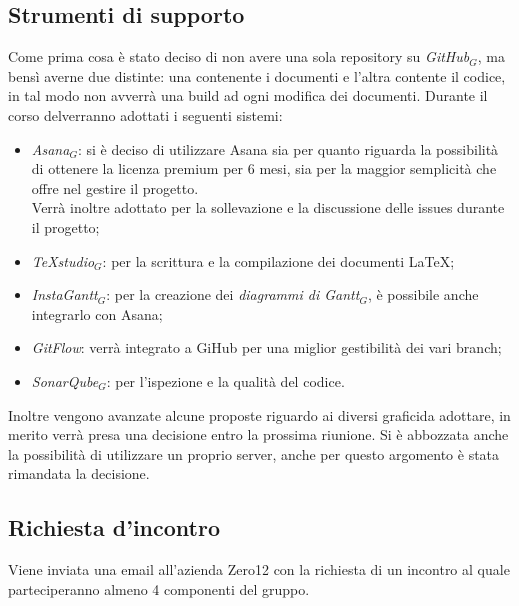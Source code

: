 \documentclass[a4paper,12pt]{article}
\begin{document}
	\subsection{Strumenti di supporto}
	Come prima cosa è stato deciso di non avere una sola repository su \textit{GitHub$_{G}$}, ma bensì averne due distinte: una contenente i documenti e l'altra contente il codice, in tal modo non avverrà una build ad ogni modifica dei documenti.
	Durante il corso delverranno adottati i seguenti sistemi:
	\begin{itemize}
		\item \textit{Asana$_{G}$}: si è deciso di utilizzare Asana sia per quanto riguarda la possibilità di ottenere la licenza premium per 6 mesi, sia per la maggior semplicità che offre nel gestire il progetto. \\
		Verrà inoltre adottato per la sollevazione e la discussione delle issues durante il progetto;
		\item \textit{TeXstudio$_{G}$}: per la scrittura e la compilazione dei documenti \LaTeX;
		\item \textit{InstaGantt$_{G}$}: per la creazione dei \textit{diagrammi di Gantt$_{G}$}, è possibile anche integrarlo con Asana;
		\item \textit{GitFlow}: verrà integrato a GiHub per una miglior gestibilità dei vari branch;
		\item \textit{SonarQube$_{G}$}: per l'ispezione e la qualità del codice.
	\end{itemize}	
	Inoltre vengono avanzate alcune proposte riguardo ai diversi graficida adottare, in merito verrà presa una decisione entro la prossima riunione. Si è abbozzata anche la possibilità di utilizzare un proprio server, anche per questo argomento è stata rimandata la decisione.
	\subsection{Richiesta d'incontro}
	Viene inviata una email all'azienda Zero12 con la richiesta di un incontro al quale parteciperanno almeno 4 componenti del gruppo.
\end{document}
